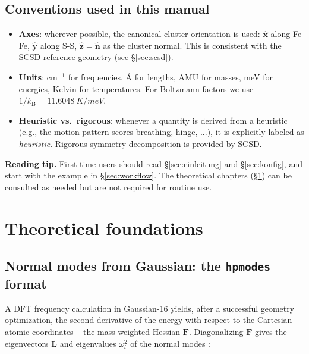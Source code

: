 \documentclass[11pt,a4paper,twoside]{article}
\newcommand{\nhat}{\hat{\mathbf{n}}}
\newcommand{\xhat}{\hat{\mathbf{x}}}
\newcommand{\yhat}{\hat{\mathbf{y}}}
\newcommand{\zhat}{\hat{\mathbf{z}}}
\newcommand{\kB}{k_{\mathrm{B}}}
\theoremstyle{remark}
\begin{document}
\subsection{Conventions used in this manual}

\begin{itemize}
  \item \textbf{Axes}: wherever possible, the canonical cluster
        orientation is used:
        $\xhat$ along Fe-Fe, $\yhat$ along S-S,
        $\zhat = \nhat$ as the cluster normal. This is consistent
        with the SCSD reference geometry (see \S\ref{sec:scsd}).
  \item \textbf{Units}: cm$^{-1}$ for frequencies,
        \AA{} for lengths, AMU for masses, meV for energies,
        Kelvin for temperatures. For Boltzmann factors we use
        $1/\kB = \SI{11.6048}{K/meV}$.
  \item \textbf{Heuristic vs.\ rigorous}: whenever a quantity is
        derived from a heuristic (e.g., the
        motion-pattern scores breathing, hinge, ...), it is
        explicitly labeled as \emph{heuristic}. Rigorous
        symmetry decomposition is provided by SCSD.
\end{itemize}

\begin{infobox}
\textbf{Reading tip.} First-time users should read
\S\ref{sec:einleitung} and \S\ref{sec:konfig}, and start with the
example in \S\ref{sec:workflow}. The theoretical chapters
(\S\ref{sec:theorie}) can be consulted as needed but are not required
for routine use.
\end{infobox}

\section{Theoretical foundations}
\label{sec:theorie}

\subsection{Normal modes from Gaussian: the \texttt{hpmodes} format}
\label{sec:normalmoden}

A DFT frequency calculation in Gaussian-16 yields, after a successful
geometry optimization, the second derivative of the energy with respect
to the Cartesian atomic coordinates -- the mass-weighted Hessian
$\mathbf{F}$. Diagonalizing $\mathbf{F}$ gives the eigenvectors
$\mathbf{L}$ and eigenvalues $\omega_l^2$ of the normal modes
\cite{WilsonDeciusCross1955}:
\end{document}
